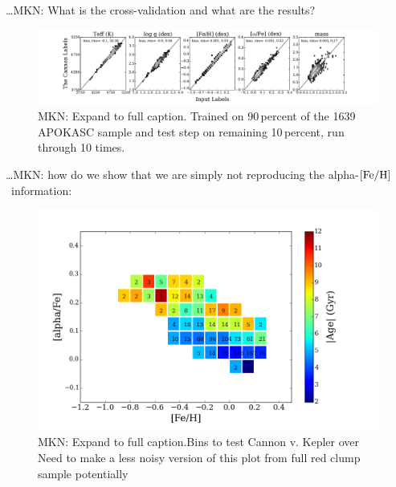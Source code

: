 \documentclass[12pt, preprint]{aastex}
\newcommand{\feh}{\mbox{$\rm [Fe/H]$}}
\begin{document}
\ldots MKN: What is the cross-validation and what are the results?
\begin{figure}[p!]
\centering
    \includegraphics[scale=0.31]{./plots/validation_1500.pdf}
  \caption{MKN: Expand to full caption.  Trained on 90\,percent of the 1639 APOKASC sample and test step on remaining 10\,percent, run through 10 times.}
\label{fig:validation}
\end{figure}


\ldots MKN: how do we show that we are simply not reproducing the alpha-\feh\ information:

\begin{figure}[p!]
\centering
    \includegraphics[scale=0.31]{./plots/alpha_feh_bins.png}
    \caption{MKN: Expand to full caption.Bins to test Cannon v. Kepler over  Need to make a less noisy version of this plot from full red clump sample potentially  }
\label{fig:alphabins}
\end{figure}
\end{document}
